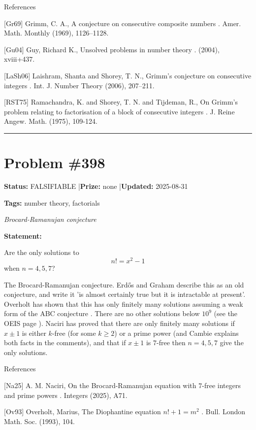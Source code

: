 \documentclass{article}
\begin{document}
References

[Gr69] Grimm, C. A., A conjecture on consecutive composite numbers . Amer. Math. Monthly (1969), 1126--1128.

[Gu04] Guy, Richard K., Unsolved problems in number theory . (2004), xviii+437.

[LaSh06] Laishram, Shanta and Shorey, T. N., Grimm's conjecture on consecutive integers . Int. J. Number Theory (2006), 207--211.

[RST75] Ramachandra, K. and Shorey, T. N. and Tijdeman, R., On Grimm's problem relating to factorisation of a block of consecutive integers . J. Reine Angew. Math. (1975), 109-124.

\noindent\rule{\linewidth}{0.4pt}


\section{Problem \#398}
\label{prob:398}

\noindent\textbf{Status:} FALSIFIABLE \quad|\quad \textbf{Prize:} none \quad|\quad \textbf{Updated:} 2025-08-31

\noindent\textbf{Tags:} number theory, factorials

\medskip
\noindent\textit{Brocard-Ramanujan conjecture}


\noindent\textbf{Statement:}

Are the only solutions to\[n!=x^2-1\]when $n=4,5,7$?




The Brocard-Ramanujan conjecture. Erd\H{o}s and Graham describe this as an old conjecture, and write it 'is almost certainly true but it is intractable at present'. Overholt \cite{Ov93} has shown that this has only finitely many solutions assuming a weak form of the ABC conjecture . There are no other solutions below $10^9$ (see the OEIS page ). Naciri \cite{Na25} has proved that there are only finitely many solutions if $x\pm 1$ is either $k$-free (for some $k\geq 2$) or a prime power (and Cambie explains both facts in the comments), and that if $x\pm 1$ is $7$-free then $n=4,5,7$ give the only solutions.




References

[Na25] A. M. Naciri, On the Brocard-Ramanujan equation with $7$-free integers and prime powers . Integers (2025), A71.

[Ov93] Overholt, Marius, The Diophantine equation $n!+1=m^2$ . Bull. London Math. Soc. (1993), 104.
\end{document}
